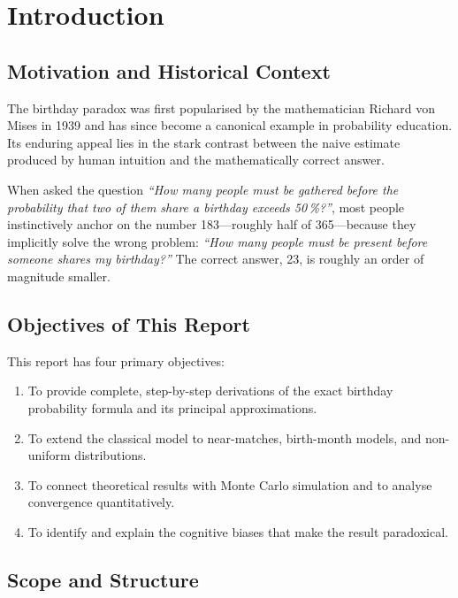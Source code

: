 \documentclass[12pt]{report}
\theoremstyle{definition}
\begin{document}
\chapter{Introduction}

\section{Motivation and Historical Context}

The birthday paradox was first popularised by the mathematician Richard von Mises in
1939 \citep{vonmises1939} and has since become a canonical example in probability
education.  Its enduring appeal lies in the stark contrast between the naive estimate
produced by human intuition and the mathematically correct answer.

When asked the question \emph{``How many people must be gathered before the probability
that two of them share a birthday exceeds 50\,\%?''}, most people instinctively anchor
on the number 183—roughly half of 365—because they implicitly solve the wrong problem:
\emph{``How many people must be present before someone shares \emph{my} birthday?''}
The correct answer, 23, is roughly an order of magnitude smaller.

\section{Objectives of This Report}

This report has four primary objectives:
\begin{enumerate}
  \item To provide complete, step-by-step derivations of the exact birthday probability
        formula and its principal approximations.
  \item To extend the classical model to near-matches, birth-month models, and
        non-uniform distributions.
  \item To connect theoretical results with Monte Carlo simulation and to analyse
        convergence quantitatively.
  \item To identify and explain the cognitive biases that make the result paradoxical.
\end{enumerate}

\section{Scope and Structure}
\end{document}
